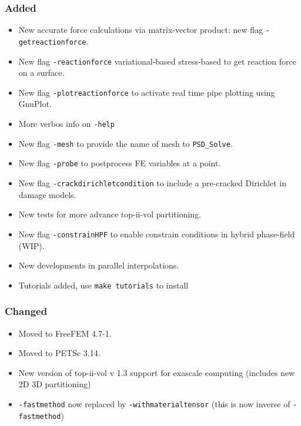 \subsubsection{Added}

\begin{itemize}
\tightlist
\item
  New accurate force calculations via matrix-vector product: new flag
  \lstinline!-getreactionforce!.
\item
  New flag \lstinline!-reactionforce! variational-based \textbar{}
  stress-based to get reaction force on a surface.
\item
  New flag \lstinline!-plotreactionforce! to activate real time pipe
  plotting using GnuPlot.
\item
  More verbos info on \lstinline!-help!
\item
  New flag \lstinline!-mesh! to provide the name of mesh to
  \lstinline!PSD_Solve!.
\item
  New flag \lstinline!-probe! to postprocess FE variables at a point.
\item
  New flag \lstinline!-crackdirichletcondition! to include a pre-cracked
  Dirichlet in damage models.
\item
  New tests for more advance top-ii-vol partitioning.
\item
  New flag \lstinline!-constrainHPF! to enable constrain conditions in
  hybrid phase-field (WIP).
\item
  New developments in parallel interpolations.
\item
  Tutorials added, use \lstinline!make tutorials! to install
\end{itemize}

\subsubsection{Changed}

\begin{itemize}
\tightlist
\item
  Moved to FreeFEM 4.7-1.
\item
  Moved to PETSc 3.14.
\item
  New version of top-ii-vol v 1.3 support for exascale computing
  (includes new 2D 3D partitioning)
\item
  \lstinline!-fastmethod! now replaced by
  \lstinline!-withmaterialtensor! (this is now inverse of
  \lstinline!-fastmethod!)
\end{itemize}

